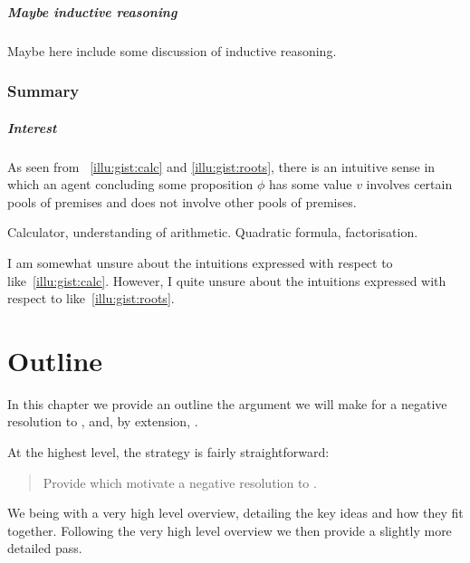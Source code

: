 \paragraph{Maybe inductive reasoning}

\begin{note}
  \color{red}
  Maybe here include some discussion of inductive reasoning.
\end{note}

\subsection{Summary}

\paragraph*{Interest}

\begin{note}
  As seen from ~\ref{illu:gist:calc} and \ref{illu:gist:roots}, there is an intuitive sense in which an agent concluding some proposition \(\phi\) has some value \(v\) involves certain pools of premises and does not involve other pools of premises.

  Calculator, understanding of arithmetic.
  Quadratic formula, factorisation.

  I am somewhat unsure about the intuitions expressed with respect to  like~\autoref{illu:gist:calc}.
  However, I quite unsure about the intuitions expressed with respect to  like~\autoref{illu:gist:roots}.
\end{note}

\chapter{Outline}
\label{cha:outline}

\begin{note}
  In this chapter we provide an outline the argument we will make for a negative resolution to \issueConstraint{}, and, by extension, \issueInclusion{}.

  At the highest level, the strategy is fairly straightforward:
  \begin{quote}
    Provide  which motivate a negative resolution to \issueConstraint{}.
  \end{quote}

  We being with a very high level overview, detailing the key ideas and how they fit together.
  Following the very high level overview we then provide a slightly more detailed pass.
\end{note}

